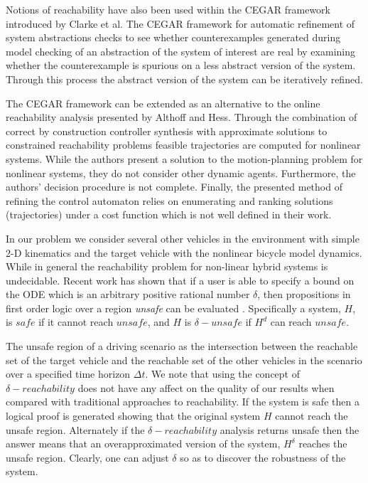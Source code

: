 Notions of reachability have also been used within the CEGAR framework introduced by Clarke et al. The CEGAR framework for automatic refinement of system abstractions checks to see whether counterexamples generated during model checking of an abstraction of the system of interest are real by examining  whether the counterexample is spurious on a less abstract version of the system. Through this process the abstract version of the system can be iteratively refined.\cite{Clarke2003}

The CEGAR framework can be extended as an alternative to the online reachability analysis presented by Althoff and Hess. Through the combination of correct by construction controller synthesis with approximate solutions to constrained reachability problems feasible trajectories are computed for nonlinear systems. While the authors present a solution to the motion-planning problem for nonlinear systems, they do not consider other dynamic agents. Furthermore, the authors' decision procedure is not complete. Finally, the presented method of refining the control automaton relies on enumerating and ranking solutions (trajectories) under a cost function which is not well defined in their work.\cite{Wolff2013}

In our problem we consider several other vehicles in the environment with simple 2-D kinematics and the target vehicle with the nonlinear bicycle model dynamics. While in general the reachability problem for non-linear hybrid systems is undecidable. Recent work has shown that if a user is able to specify a bound on the ODE which is an arbitrary positive rational number \(\delta\), then propositions in first order logic over a region \textit{unsafe} can be evaluated \cite{gao2014delta}. Specifically a system, \(H\), is \(safe\) if it cannot reach \(unsafe\), and \(H\) is \(\delta-unsafe\) if \(H^d\) can reach \(unsafe\). 

The unsafe region of a driving scenario as the intersection between the reachable set of the target vehicle and the reachable set of the other vehicles in the scenario over a specified time horizon \(\Delta t\). We note that using the concept of \(\delta-reachability\) does not have any affect on the quality of our results when compared with traditional approaches to reachability. If the system is safe then a logical proof is generated showing that the original system \(H\) cannot reach the unsafe region. Alternately if the \(\delta-reachability\) analysis returns unsafe then the answer means that an overapproximated version of the system, \(H^{\delta}\) reaches the unsafe region. Clearly, one can adjust \(\delta\) so as to discover the robustness of the system. 

